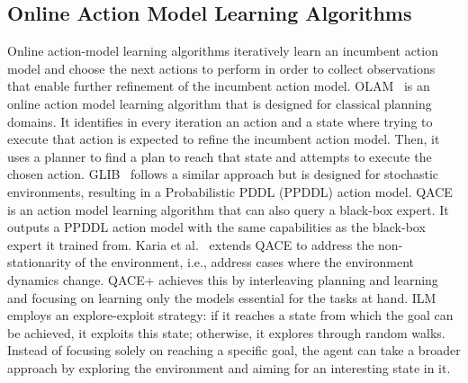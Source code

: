 \subsection{Online Action Model Learning Algorithms}
\label{sec:related-online-action-model-learning}
Online action-model learning algorithms 
iteratively learn an incumbent action model and choose the next actions to perform in order to collect observations that enable further refinement of the incumbent action model. 
OLAM~\citep{lamanna2021online} is an online action model learning algorithm that is designed for classical planning domains. It identifies in every iteration an action and a state where trying to execute that action is expected to refine the incumbent action model. 
Then, it uses a planner to find a plan to reach that state and attempts to execute the chosen action. 
GLIB~\citep{chitnis2021glib} follows a similar approach but is designed for stochastic environments, resulting in a Probabilistic PDDL (PPDDL) action model.
QACE~\citep{verma2023autonomous} is an action model learning algorithm that can also query a black-box expert. It outputs a PPDDL action model with the same capabilities as the black-box expert it trained from. 
Karia et al.~\citeyear{karia2023epistemic} extends QACE to address the non-stationarity of the environment, i.e., address cases where the environment dynamics change. QACE+ achieves this by interleaving planning and learning and focusing on learning only the models essential for the tasks at hand.
ILM~\citep{ng2019incremental} employs an explore-exploit strategy: if it reaches a state from which the goal can be achieved, it exploits this state; otherwise, it explores through random walks.
Instead of focusing solely on reaching a specific goal, the agent can take a broader approach by exploring the environment and aiming for an interesting state in it.




